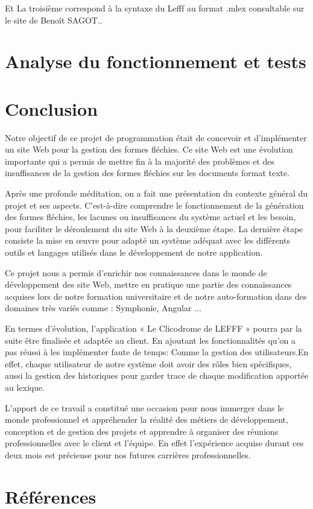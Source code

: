 \documentclass[12pt,a4paper]{article}
\begin{document}
Et La troisième  correspond à la syntaxe du Lefff au format .mlex consultable sur le site de Benoît SAGOT..

						


\section{Analyse du fonctionnement et tests}

\section{Conclusion}

Notre objectif de ce projet de programmation était de concevoir et d'implémenter un site Web pour la gestion des formes fléchies.
Ce site Web est une évolution importante qui a permis de mettre fin à la majorité des problèmes et des insuffisances de la gestion des formes fléchies sur les documents format texte. 


Après une profonde méditation, on a fait une présentation du contexte général du projet et ses aspects. C'est-à-dire comprendre le fonctionnement de la génération des formes fléchies, les lacunes ou insuffisances du système actuel et les besoin, pour faciliter le déroulement du site Web à la deuxième étape. 
La dernière étape consiste la mise en œuvre pour adapté un système
adéquat avec les différents outils et langages utilisés dans le développement de notre application.

Ce projet nous a permis d'enrichir nos connaissances dans le monde de développement des site Web, mettre en pratique une partie des connaissances acquises lors de notre formation universitaire et de notre auto-formation dans des domaines très variés comme :  Symphonie, Angular ...
 

En termes d'évolution, l'application « Le Clicodrome de LEFFF » pourra par la suite être finalisée et adaptée au client.
En ajoutant les fonctionnalités qu'on a pas réussi à les implémenter faute de temps: Comme la gestion des utilisateurs.En effet, chaque utilisateur de notre système doit avoir des rôles bien spécifiques, aussi la gestion des historiques pour garder trace de chaque modification apportée au lexique.

L'apport de ce travail a constitué une occasion pour nous immerger dans le monde professionnel et appréhender la réalité des métiers de développement, conception et de gestion des projets et apprendre à organiser des réunions professionnelles avec le client et l'équipe. En effet l'expérience acquise durant ces deux mois est précieuse pour nos futures carrières professionnelles.
\section{Références}


\end{document}
